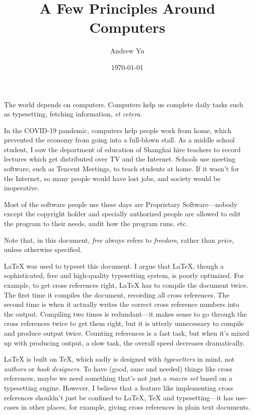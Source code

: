 \documentclass[twocolumn]{article}
\title{A Few Principles Around Computers}
\author{Andrew Yu}
\date{\today}
\newcommand{\etc}{\emph{et cetera}}
\begin{document}
\maketitle
The world depends on computers. Computers help us complete daily tasks such as typesetting, fetching information, \etc{}.

In the COVID-19 pandemic, computers help people work from home, which prevented the economy from going into a full-blown stall. As a middle school student, I saw the department of education of Shanghai hire teachers to record lectures which get distributed over TV and the Internet. Schools use meeting software, such as Tencent Meetings, to teach students at home. If it wasn't for the Internet, so many people would have lost jobs, and society would be inoperative.

Most of the software people use these days are Proprietary Software---nobody except the copyright holder and specially authorized people are allowed to edit the program to their needs, audit how the program runs, etc.

Note that, in this document, \emph{free} always refers to \emph{freedom}, rather than \emph{price}, unless otherwise specified.

\LaTeX{} was used to typeset this document. I argue that \LaTeX, though a sophisticated, free and high-quality typesetting system, is poorly optimized. For example, to get cross references right, \LaTeX{} has to compile the document twice. The first time it compiles the document, recording all cross references. The second time is when it actually writes the correct cross reference numbers into the output. Compiling two times is redundant---it makes sense to go through the cross references twice to get them right, but it is utterly unnecessary to compile and produce output twice. Counting references is a fast task, but when it's mixed up with producing output, a slow task, the overall speed decreases dramatically.

\LaTeX{} is built on \TeX{}, which sadly is designed with \emph{typesetters} in mind, not \emph{authors} or \emph{book designers}. To have (good, sane and needed) things like cross references, maybe we need something that's not just a \emph{macro set} based on a typesetting engine. However, I believe that a feature like implementing cross references shouldn't just be confined to \LaTeX, \TeX{} and typesetting---it has use-cases in other places, for example, giving cross references in plain text documents.
\end{document}
